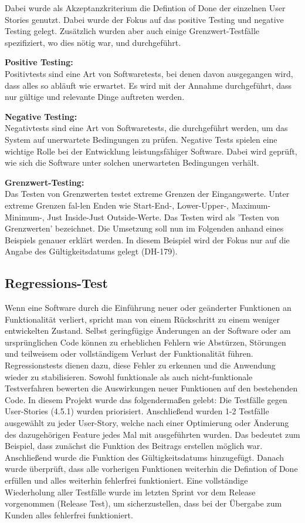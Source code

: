 Dabei wurde als Akzeptanzkriterium die Defintion of Done der einzelnen User Stories genutzt. Dabei wurde der Fokus auf das positive Testing und negative Testing gelegt. Zusätzlich wurden aber auch einige Grenzwert-Testfälle spezifiziert, wo dies nötig war, und durchgeführt.

\textbf{Positive Testing:} \\
Positivtests sind eine Art von Softwaretests, bei denen davon ausgegangen wird, dass alles so abläuft wie erwartet. Es wird mit der Annahme durchgeführt, dass nur gültige und relevante Dinge auftreten werden.

\textbf{Negative Testing:} \\
Negativtests sind eine Art von Softwaretests, die durchgeführt werden, um das System auf unerwartete Bedingungen zu prüfen. Negative Tests spielen eine wichtige Rolle bei der Entwicklung leistungsfähiger Software. Dabei wird geprüft, wie sich die Software unter solchen unerwarteten Bedingungen verhält.

\textbf{Grenzwert-Testing:} \\
Das Testen von Grenzwerten testet extreme Grenzen der Eingangswerte. Unter extreme Grenzen fal-len Enden wie Start-End-, Lower-Upper-, Maximum-Minimum-, Just Inside-Just Outside-Werte. Das Testen wird als 'Testen von Grenzwerten' bezeichnet.
Die Umsetzung soll nun im Folgenden anhand eines Beispiels genauer erklärt werden. In diesem Beispiel wird der Fokus nur auf die Angabe des Gültigkeitsdatums gelegt (DH-179).

\subsection{Regressions-Test}
\label{sub:UmsetzungTestRegression}

Wenn eine Software durch die Einführung neuer oder geänderter Funktionen an Funktionalität verliert, spricht man von einem Rückschritt zu einem weniger entwickelten Zustand. Selbst geringfügige Änderungen an der Software oder am ursprünglichen Code können zu erheblichen Fehlern wie Abstürzen, Störungen und teilweisem oder vollständigem Verlust der Funktionalität führen.
Regressionstests dienen dazu, diese Fehler zu erkennen und die Anwendung wieder zu stabilisieren. Sowohl funktionale als auch nicht-funktionale Testverfahren bewerten die Auswirkungen neuer Funktionen auf den bestehenden Code.
In diesem Projekt wurde das folgendermaßen gelebt: Die Testfälle gegen User-Stories (4.5.1) wurden priorisiert. Anschließend wurden 1-2 Testfälle ausgewählt zu jeder User-Story, welche nach einer Optimierung oder Änderung des dazugehörigen Feature jedes Mal mit ausgeführten wurden. Das bedeutet zum Beispiel, dass zunächst die Funktion des Beitrags erstellen möglich war. Anschließend wurde die Funktion des Gültigkeitsdatums hinzugefügt. Danach wurde überprüft, dass alle vorherigen Funktionen weiterhin die Defintion of Done erfüllen und alles weiterhin fehlerfrei funktioniert.
Eine vollständige Wiederholung aller Testfälle wurde im letzten Sprint vor dem Release vorgenommen (Release Test), um sicherzustellen, dass bei der Übergabe zum Kunden alles fehlerfrei funktioniert.


